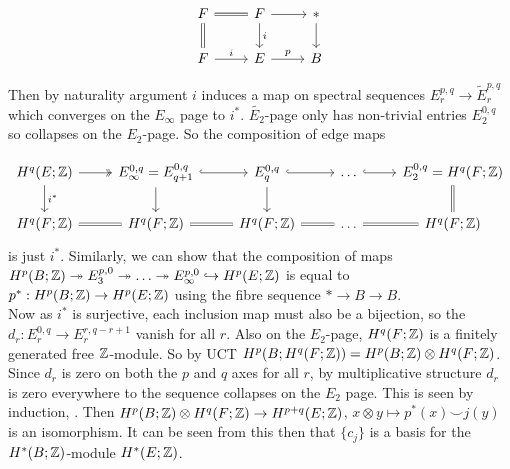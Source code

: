 \documentclass[10pt,a4paper]{article}
\begin{document}
\begin{enumerate}
\[\begin{tikzcd}
F \arrow[r,equal] \arrow[d,equal] & F\arrow{r}\arrow[d,"i"] & * \arrow{d}\\
F\arrow[r,"i"] & E\arrow[r,"p"]& B
\end{tikzcd}\]

Then by naturality argument $i$ induces a map on spectral sequences $E_r^{p,q}\to\tilde{E}_r^{p,q}$ which converges on the $E_\infty$ page to $i^*$. $\tilde{E_2}$-page only has non-trivial entries $E_2^{0,q}$ so collapses on the $E_2$-page. So the composition of edge maps

\[\begin	{tikzcd}
H^q(E;\Z) \arrow[r,two heads]\arrow[d,"i^*"] &E^{0,q}_\infty = E^{0,q}_{q+1} \arrow[r,hook]\arrow[d]& E^{0,q}_q\arrow[r,hook]\arrow[d] &\ldots\arrow[r,hook]& E_2^{0,q} = H^q(F;\Z)\arrow[d,equal]\\
H^q(F;\Z)\arrow[r,equal]&H^q(F;\Z)\arrow[r,equal]&H^q(F;\Z)\arrow[r,equal]&\ldots\arrow[r,equal]&H^q(F;\Z)
\end{tikzcd}\]
is just $i^*$. Similarly, we can show that the composition of maps $H^p(B;\mathbb{Z})\twoheadrightarrow E^{p,0}_3\twoheadrightarrow\ldots \twoheadrightarrow E^{p,0}_\infty\hookrightarrow H^p(E;\mathbb{Z})$ is equal to $p^*: H^p(B;\mathbb{Z})\to H^p(E;\mathbb{Z})$ using the fibre sequence $*\to B \to B$.\\
Now as $i^*$ is surjective, each inclusion map must also be a bijection, so the $d_r:E^{0,q}_r\to E^{r,q-r+1}_r$ vanish for all $r$. Also on the $E_2$-page, $H^q(F;\mathbb{Z})$ is a finitely generated free $\mathbb{Z}$-module. So by UCT $H^p(B;H^q(F;\mathbb{Z})) = H^p(B;\mathbb{Z})\otimes H^q(F;\mathbb{Z})$. Since $d_r$ is zero on both the $p$ and $q$ axes for all $r$, by multiplicative structure $d_r$ is zero everywhere to the sequence collapses on the $E_2$ page. This is seen by induction, . Then $H^p(B;\mathbb{Z})\otimes H^q(F;\mathbb{Z})\to H^{p+q}(E;\mathbb{Z})$, $x\otimes y\mapsto p^*(x)\smile j(y)$ is an isomorphism. It can be seen from this then that $\{c_j\}$ is a basis for the $H^*(B;\mathbb{Z})$-module $H^*(E;\mathbb{Z})$.
\end{enumerate}
\end{document}

